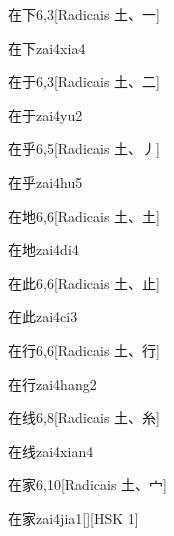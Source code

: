 \begin{entry}{在下}{6,3}[Radicais ⼟、⼀]
  \begin{phonetics}{在下}{zai4xia4}
  \end{phonetics}
\end{entry}

\begin{entry}{在于}{6,3}[Radicais ⼟、⼆]
  \begin{phonetics}{在于}{zai4yu2}
  \end{phonetics}
\end{entry}

\begin{entry}{在乎}{6,5}[Radicais ⼟、⼃]
  \begin{phonetics}{在乎}{zai4hu5}
  \end{phonetics}
\end{entry}

\begin{entry}{在地}{6,6}[Radicais ⼟、⼟]
  \begin{phonetics}{在地}{zai4di4}
  \end{phonetics}
\end{entry}

\begin{entry}{在此}{6,6}[Radicais ⼟、⽌]
  \begin{phonetics}{在此}{zai4ci3}
  \end{phonetics}
\end{entry}

\begin{entry}{在行}{6,6}[Radicais ⼟、⾏]
  \begin{phonetics}{在行}{zai4hang2}
  \end{phonetics}
\end{entry}

\begin{entry}{在线}{6,8}[Radicais ⼟、⽷]
  \begin{phonetics}{在线}{zai4xian4}
  \end{phonetics}
\end{entry}

\begin{entry}{在家}{6,10}[Radicais ⼟、⼧]
  \begin{phonetics}{在家}{zai4jia1}[][HSK 1]
  \end{phonetics}
\end{entry}

